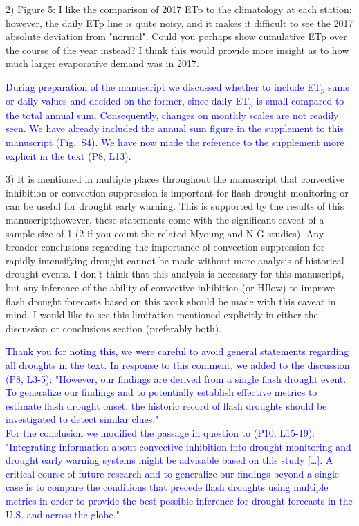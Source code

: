 \documentclass[hess, manuscript]{copernicus}
\def\TG{\textcolor{blue}}
\begin{document}
2)  Figure  5:  I  like  the  comparison  of  2017  ETp  to  the  climatology  at  each  station; however,  the  daily  ETp  line  is  quite  noisy,  and  it  makes  it  difficult  to  see  the  2017 absolute deviation from "normal".  Could you perhaps show cumulative ETp over the course of the year instead?  I think this would provide more insight as to how much larger evaporative demand was in 2017.

\TG{During preparation of the manuscript we discussed whether to include ET$_p$ sums or daily values and decided on the former, since daily ET$_p$ is small compared to the total annual sum. Consequently, changes on monthly scales are not readily seen. We have already included the annual sum figure  in the supplement to this manuscript (Fig.~S4). We have now made the reference to the supplement more explicit in the text (P8, L13).}

3) It is mentioned in multiple places throughout the manuscript that convective inhibition or convection suppression is important for flash drought monitoring or can be
useful for drought early warning.  This is supported by the results of this manuscript;however, these statements come with the significant caveat of a sample size of 1 (2 if you count the related Myoung and N-G studies).  Any broader conclusions regarding
the importance of convection suppression for rapidly intensifying drought cannot be made without more analysis of historical drought events. I don’t think that this analysis is necessary for this manuscript, but any inference of the ability of convective inhibition (or HIlow) to improve flash drought forecasts based on this work should be made with this caveat in mind.  I would like to see this limitation mentioned explicitly in either the
discussion or conclusions section (preferably both).

\TG{Thank you for noting this, we were careful to avoid general statements regarding all droughts in the text. In response to this comment, we added to the discussion (P8, L3-5): "However, our findings are derived from a single flash drought event. To generalize our findings and to potentially establish effective metrics to estimate flash drought onset, the historic record of flash droughts should be investigated to detect similar clues." \\
For the conclusion we modified the passage in question to (P10, L15-19): "Integrating information about convective inhibition into drought monitoring and drought early warning systems might be advisable based on this study [\ldots]. A critical course of future research and to generalize our findings beyond a single case is to compare the conditions that precede flash droughts using multiple metrics in order to provide the best possible inference for drought forecasts in the U.S. and across the globe."}
\end{document}
